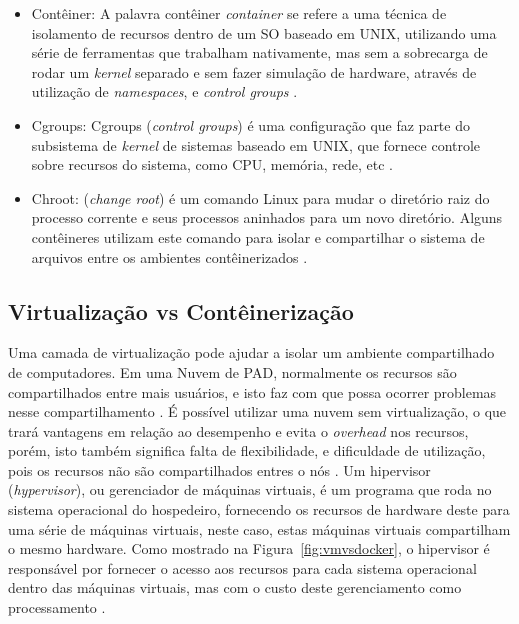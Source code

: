 \documentclass[twoside,english,brazilian]{UNISINOSartigo}
\begin{document}
\begin{itemize}
	\item Contêiner: A palavra contêiner \textit{container} se refere a uma técnica de isolamento de recursos dentro de um SO baseado em UNIX, utilizando uma série de ferramentas que trabalham nativamente, mas sem a sobrecarga de rodar um \textit{kernel} separado e sem fazer simulação de hardware, através de utilização de \textit{namespaces}, e \textit{control groups} \cite{LXC2016}.
	\item Cgroups: Cgroups (\textit{control groups}) é uma configuração que faz parte do subsistema de \textit{kernel} de sistemas baseado em UNIX, que fornece controle sobre recursos do sistema, como CPU, memória, rede, etc  \cite{NICKOLOFF2016}.
	\item Chroot: (\textit{change root}) é um comando Linux para mudar o diretório raiz do processo corrente e seus processos aninhados para um novo diretório. Alguns contêineres utilizam este comando para isolar e compartilhar o sistema de arquivos entre os ambientes contêinerizados \cite{Dua2014}. 
\end{itemize}

\subsection{Virtualização vs Contêinerização}
\label{virtualization}
Uma camada de virtualização pode ajudar a isolar um ambiente compartilhado de computadores. Em uma Nuvem de PAD, normalmente os recursos são compartilhados entre mais usuários, e isto faz com que possa ocorrer problemas nesse compartilhamento \cite{Xavier2013}. É possível utilizar uma nuvem sem virtualização, o que trará vantagens em relação ao desempenho e evita o \textit{overhead} nos recursos, porém, isto também significa falta de flexibilidade, e dificuldade de utilização, pois os recursos não são compartilhados entres o nós \cite{Kominos2017}. Um hipervisor (\textit{hypervisor}), ou gerenciador de máquinas virtuais, é um programa que roda no sistema operacional do hospedeiro, fornecendo os recursos de hardware deste para uma série de máquinas virtuais, neste caso, estas máquinas virtuais compartilham o mesmo hardware. Como mostrado na Figura~\ref{fig:vmvsdocker}, o hipervisor é responsável por fornecer o acesso aos recursos para cada sistema operacional dentro das máquinas virtuais, mas com o custo deste gerenciamento como processamento \cite{Zhang2016}. 
\end{document}

